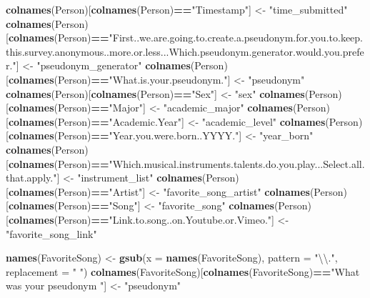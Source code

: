 \documentclass[]{article}
\newenvironment{Shaded}{\begin{snugshade}}{\end{snugshade}}
\newcommand{\CharTok}[1]{\textcolor[rgb]{0.31,0.60,0.02}{#1}}
\newcommand{\DataTypeTok}[1]{\textcolor[rgb]{0.13,0.29,0.53}{#1}}
\newcommand{\KeywordTok}[1]{\textcolor[rgb]{0.13,0.29,0.53}{\textbf{#1}}}
\newcommand{\NormalTok}[1]{#1}
\newcommand{\OperatorTok}[1]{\textcolor[rgb]{0.81,0.36,0.00}{\textbf{#1}}}
\newcommand{\StringTok}[1]{\textcolor[rgb]{0.31,0.60,0.02}{#1}}
\begin{document}
\begin{Shaded}
\begin{Highlighting}[]
\KeywordTok{colnames}\NormalTok{(Person)[}\KeywordTok{colnames}\NormalTok{(Person)}\OperatorTok{==}\StringTok{"Timestamp"}\NormalTok{] <-}\StringTok{ "time_submitted"}
\KeywordTok{colnames}\NormalTok{(Person)[}\KeywordTok{colnames}\NormalTok{(Person)}\OperatorTok{==}\StringTok{"First..we.are.going.to.create.a.pseudonym.for.you.to.keep.this.survey.anonymous..more.or.less...Which.pseudonym.generator.would.you.prefer."}\NormalTok{] <-}\StringTok{ "pseudonym_generator"}
\KeywordTok{colnames}\NormalTok{(Person)[}\KeywordTok{colnames}\NormalTok{(Person)}\OperatorTok{==}\StringTok{"What.is.your.pseudonym."}\NormalTok{] <-}\StringTok{ "pseudonym"}
\KeywordTok{colnames}\NormalTok{(Person)[}\KeywordTok{colnames}\NormalTok{(Person)}\OperatorTok{==}\StringTok{"Sex"}\NormalTok{] <-}\StringTok{ "sex"}
\KeywordTok{colnames}\NormalTok{(Person)[}\KeywordTok{colnames}\NormalTok{(Person)}\OperatorTok{==}\StringTok{"Major"}\NormalTok{] <-}\StringTok{ "academic_major"}
\KeywordTok{colnames}\NormalTok{(Person)[}\KeywordTok{colnames}\NormalTok{(Person)}\OperatorTok{==}\StringTok{"Academic.Year"}\NormalTok{] <-}\StringTok{ "academic_level"}
\KeywordTok{colnames}\NormalTok{(Person)[}\KeywordTok{colnames}\NormalTok{(Person)}\OperatorTok{==}\StringTok{"Year.you.were.born..YYYY."}\NormalTok{] <-}\StringTok{ "year_born"}
\KeywordTok{colnames}\NormalTok{(Person)[}\KeywordTok{colnames}\NormalTok{(Person)}\OperatorTok{==}\StringTok{"Which.musical.instruments.talents.do.you.play...Select.all.that.apply."}\NormalTok{] <-}\StringTok{ "instrument_list"}
\KeywordTok{colnames}\NormalTok{(Person)[}\KeywordTok{colnames}\NormalTok{(Person)}\OperatorTok{==}\StringTok{"Artist"}\NormalTok{] <-}\StringTok{ "favorite_song_artist"}
\KeywordTok{colnames}\NormalTok{(Person)[}\KeywordTok{colnames}\NormalTok{(Person)}\OperatorTok{==}\StringTok{"Song"}\NormalTok{] <-}\StringTok{ "favorite_song"}
\KeywordTok{colnames}\NormalTok{(Person)[}\KeywordTok{colnames}\NormalTok{(Person)}\OperatorTok{==}\StringTok{"Link.to.song..on.Youtube.or.Vimeo."}\NormalTok{] <-}\StringTok{ "favorite_song_link"}

\KeywordTok{names}\NormalTok{(FavoriteSong) <-}\StringTok{ }\KeywordTok{gsub}\NormalTok{(}\DataTypeTok{x =} \KeywordTok{names}\NormalTok{(FavoriteSong), }\DataTypeTok{pattern =} \StringTok{"}\CharTok{\textbackslash{}\textbackslash{}}\StringTok{."}\NormalTok{, }\DataTypeTok{replacement =} \StringTok{" "}\NormalTok{)}
\KeywordTok{colnames}\NormalTok{(FavoriteSong)[}\KeywordTok{colnames}\NormalTok{(FavoriteSong)}\OperatorTok{==}\StringTok{"What was your pseudonym "}\NormalTok{] <-}\StringTok{ "pseudonym"}
\end{Highlighting}
\end{Shaded}
\end{document}
